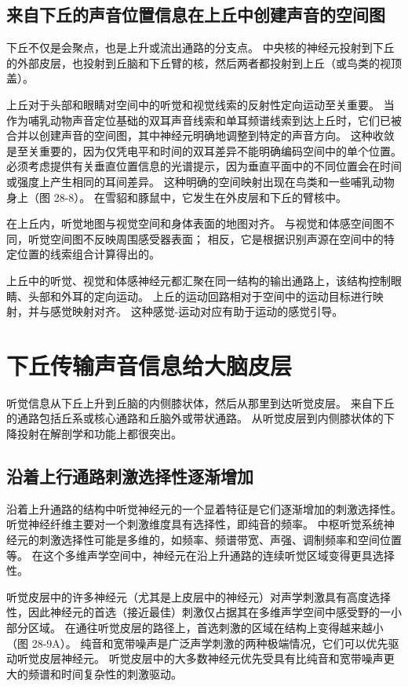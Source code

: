 

\subsection{来自下丘的声音位置信息在上丘中创建声音的空间图}
下丘不仅是会聚点，也是上升或流出通路的分支点。 中央核的神经元投射到下丘的外部皮层，也投射到丘脑和下丘臂的核，然后两者都投射到上丘（或鸟类的视顶盖）。

上丘对于头部和眼睛对空间中的听觉和视觉线索的反射性定向运动至关重要。 当作为哺乳动物声音定位基础的双耳声音线索和单耳频谱线索到达上丘时，它们已被合并以创建声音的空间图，其中神经元明确地调整到特定的声音方向。 这种收敛是至关重要的，因为仅凭电平和时间的双耳差异不能明确编码空间中的单个位置。 必须考虑提供有关垂直位置信息的光谱提示，因为垂直平面中的不同位置会在时间或强度上产生相同的耳间差异。 这种明确的空间映射出现在鸟类和一些哺乳动物身上（图 28-8）。 在雪貂和豚鼠中，它发生在外皮层和下丘的臂核中。

在上丘内，听觉地图与视觉空间和身体表面的地图对齐。 与视觉和体感空间图不同，听觉空间图不反映周围感受器表面； 相反，它是根据识别声源在空间中的特定位置的线索组合计算得出的。

上丘中的听觉、视觉和体感神经元都汇聚在同一结构的输出通路上，该结构控制眼睛、头部和外耳的定向运动。 上丘的运动回路相对于空间中的运动目标进行映射，并与感觉映射对齐。 这种感觉-运动对应有助于运动的感觉引导。



\section{下丘传输声音信息给大脑皮层}
听觉信息从下丘上升到丘脑的内侧膝状体，然后从那里到达听觉皮层。 
来自下丘的通路包括丘系或核心通路和丘脑外或带状通路。 
从听觉皮层到内侧膝状体的下降投射在解剖学和功能上都很突出。

\subsection{沿着上行通路刺激选择性逐渐增加}
沿着上升通路的结构中听觉神经元的一个显着特征是它们逐渐增加的刺激选择性。 
听觉神经纤维主要对一个刺激维度具有选择性，即纯音的频率。 
中枢听觉系统神经元的刺激选择性可能是多维的，如频率、频谱带宽、声强、调制频率和空间位置等。 
在这个多维声学空间中，神经元在沿上升通路的连续听觉区域变得更具选择性。

听觉皮层中的许多神经元（尤其是上皮层中的神经元）对声学刺激具有高度选择性，因此神经元的首选（接近最佳）刺激仅占据其在多维声学空间中感受野的一小部分区域。 
在通往听觉皮层的路径上，首选刺激的区域在结构上变得越来越小（图 28-9A）。 
纯音和宽带噪声是广泛声学刺激的两种极端情况，它们可以优先驱动听觉皮层神经元。 
听觉皮层中的大多数神经元优先受具有比纯音和宽带噪声更大的频谱和时间复杂性的刺激驱动。

